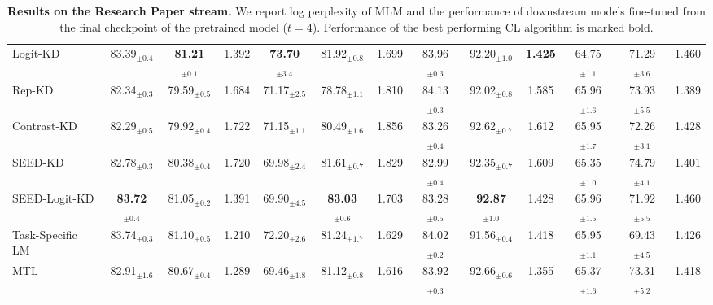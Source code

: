 \begin{table}[]
{\begin{tabular}{@{}lcccccccccccc@{}}
Logit-KD      & 83.39$_{\pm 0.4}$          & \textbf{81.21$_{\pm 0.1}$}  & 1.392       & \textbf{73.70$_{\pm 3.4}$}             & 81.92$_{\pm 0.8}$      & 1.699       & 83.96$_{\pm 0.3}$              & 92.20$_{\pm 1.0}$      & \textbf{1.425}       & 64.75$_{\pm 1.1}$         & 71.29$_{\pm 3.6}$   & 1.460      \\
Rep-KD        & 82.34$_{\pm 0.3}$          & 79.59$_{\pm 0.5}$ & 1.684        & 71.17$_{\pm 2.5}$             & 78.78$_{\pm 1.1}$      & 1.810       & 84.13$_{\pm 0.3}$              & 92.02$_{\pm 0.8}$   & 1.585           &      65.96$_{\pm 1.6}$      & 73.93$_{\pm 5.5}$       &      1.389     \\
Contrast-KD   & 82.29$_{\pm 0.5}$          & 79.92$_{\pm 0.4}$  & 1.722        & 71.15$_{\pm 1.1}$             & 80.49$_{\pm 1.6}$    & 1.856         & 83.26$_{\pm 0.4}$              & 92.62$_{\pm 0.7}$   & 1.612          & 65.95$_{\pm 1.7}$         & 72.26$_{\pm 3.1}$   & 1.428     \\
SEED-KD & 82.78$_{\pm 0.3}$ & 80.38$_{\pm 0.4}$ & 1.720 & 69.98$_{\pm 2.4}$  & 81.61$_{\pm 0.7}$ & 1.829 & 82.99$_{\pm 0.4}$ & 92.35$_{\pm 0.7}$ & 1.609 & 65.35$_{\pm 1.0}$ & 74.79$_{\pm 4.1}$ & 1.401 \\ 
SEED-Logit-KD &  \textbf{83.72$_{\pm 0.4}$} & 81.05$_{\pm 0.2}$  & 1.391        & 69.90$_{\pm 4.5}$             & \textbf{83.03$_{\pm 0.6}$}   & 1.703           & 83.28$_{\pm 0.5}$              & \textbf{92.87$_{\pm 1.0}$}     & 1.428        & 65.96$_{\pm 1.5}$         & 71.92$_{\pm 5.5}$    & 1.460    \\ \midrule
Task-Specific LM        & 83.74$_{\pm 0.3}$          & 81.10$_{\pm 0.5}$    & 1.210      & 72.20$_{\pm 2.6}$             & 81.24$_{\pm 1.7}$   & 1.629          & 84.02$_{\pm 0.2}$              & 91.56$_{\pm 0.4}$        &  1.418     & 65.95$_{\pm 1.1}$         & 69.43$_{\pm 4.5}$  & 1.426      \\
MTL           & 82.91$_{\pm 1.6}$          & 80.67$_{\pm 0.4}$   & 1.289        & 69.46$_{\pm 1.8}$             & 81.12$_{\pm 0.8}$  & 1.616        & 83.92$_{\pm 0.3}$              & 92.66$_{\pm 0.6}$     &  1.355        & 65.37$_{\pm 1.6}$         & 73.31$_{\pm 5.2}$  & 1.418 \\  \bottomrule
\end{tabular}
}
\caption{\small \textbf{Results on the Research Paper stream.} We report log perplexity of MLM and the performance of downstream models fine-tuned from the final checkpoint of the pretrained model ($t=4$). Performance of the best performing CL algorithm is marked bold.
}
\label{tab:academics}
\vspace{-0.2cm}
\end{table}
